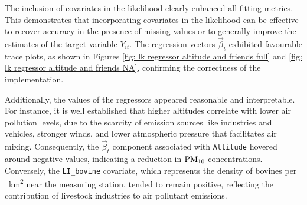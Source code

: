 \documentclass[12pt,	%
	a4paper,		%
	twoside,		%
	openright,		%
	titlepage,%
	]{book}
\theoremstyle{definition}
\begin{document}
The inclusion of covariates in the likelihood clearly enhanced all fitting metrics. This demonstrates that incorporating covariates in the likelihood can be effective to recover accuracy in the presence of missing values or to generally improve the estimates of the target variable $Y_{it}$. The regression vectors $\vec{\beta}_t$ exhibited favourable trace plots, as shown in Figures \ref{fig: lk regressor altitude and friends full} and \ref{fig: lk regressor altitude and friends NA}, confirming the correctness of the implementation. 

Additionally, the values of the regressors appeared reasonable and interpretable. For instance, it is well established that higher altitudes correlate with lower air pollution levels, due to the scarcity of emission sources like industries and vehicles, stronger winds, and lower atmospheric pressure that facilitates air mixing. Consequently, the $\vec{\beta}_t$ component associated with \texttt{Altitude} hovered around negative values, indicating a reduction in $\text{PM}_{10}$ concentrations. Conversely, the \texttt{LI\_bovine} covariate, which represents the density of bovines per \SI{}{km^2} near the measuring station, tended to remain positive, reflecting the contribution of livestock industries to air pollutant emissions.
\end{document}
